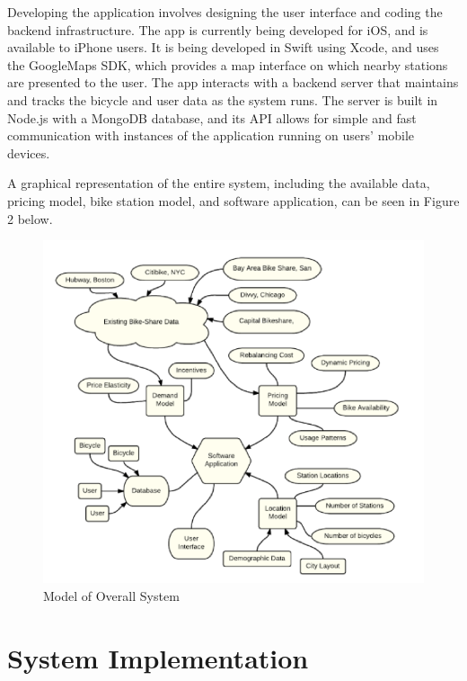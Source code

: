\documentclass{sig-alternate}
\begin{document}
Developing the application involves designing the user interface and coding the backend infrastructure. The app is currently being developed for iOS, and is available to iPhone users. It is being developed in Swift using Xcode, and uses the GoogleMaps SDK, which provides a map interface on which nearby stations are presented to the user. The app interacts with a backend server that maintains and tracks the bicycle and user data as the system runs. The server is built in Node.js with a MongoDB database, and its API allows for simple and fast communication with instances of the application running on users' mobile devices. \newline

A graphical representation of the entire system, including the available data, pricing model, bike station model, and software application, can be seen in Figure 2 below.


\begin{figure}[htb!]	\begin{center}
		\includegraphics[width=1.0\linewidth]{model}
	\end{center}
	\vspace{-12pt}
	\caption{Model of Overall System}
	\label{fig:heatmap}
\end{figure}

\section{System Implementation}
\end{document}
